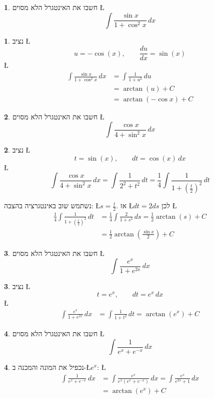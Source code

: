 \documentclass[english,hebrew]{article}
\theoremstyle{definition}
\newtheorem*{problem*}{\protect\problemname}
\theoremstyle{definition}
\newtheorem*{sol*}{\protect\solutionname}
\providecommand{\problemname}{בעיה}
\providecommand{\solutionname}{פתרון}
\begin{document}
\begin{problem*}
חשבו את האינטגרל הלא מסוים \L{%
\[
\int\frac{\sin x}{1+\cos^{2}x}\,dx
\]
}%
\end{problem*}
\begin{sol*}
נציב \L{%
\[
u=-\cos(x),\qquad\frac{du}{dx}=\sin(x)
\]
}%
\L{%
\begin{align*}
\int\frac{\sin x}{1+\cos^{2}x}\,dx & =\int\frac{1}{1+u^{2}}\,du\\
 & =\arctan(u)+C\\
 & =\arctan(-\cos x)+C
\end{align*}
}%
\end{sol*}
\begin{problem*}
חשבו את האינטגרל הלא מסוים \L{%
\[
\int\frac{\cos x}{4+\sin^{2}x}\,dx
\]
}%
\end{problem*}
\begin{sol*}
נציב \L{%
\[
t=\sin(x),\qquad dt=\cos(x)\,dx
\]
}%
\L{%
\[
\int\frac{\cos x}{4+\sin^{2}x}\,dx=\int\frac{1}{2^{2}+t^{2}}\,dt=\frac{1}{4}\int\frac{1}{1+\left(\frac{t}{2}\right)^{2}}\,dt
\]
}%

נשתמש שוב באינטגרציה בהצבה: \L{$s=\frac{t}{2}$}. אז \L{$dt=2ds$}
לכן \L{%
\begin{align*}
\frac{1}{4}\int\frac{1}{1+\left(\frac{t}{2}\right)^{2}}\,dt & =\frac{1}{4}\int\frac{2}{1+s^{2}}\,ds=\frac{1}{2}\arctan(s)+C\\
 & =\frac{1}{2}\arctan\!\left(\frac{\sin x}{2}\right)+C
\end{align*}
}%
\end{sol*}
\begin{problem*}
חשבו את האינטגרל הלא מסוים \L{%
\[
\int\frac{e^{x}}{1+e^{2x}}\,dx
\]
}%
\end{problem*}
\begin{sol*}
נציב \L{%
\[
t=e^{x},\qquad dt=e^{x}\,dx
\]
}%
\L{%
\begin{align*}
\int\frac{e^{x}}{1+e^{2x}}\,dx & =\int\frac{1}{1+t^{2}}\,dt=\arctan(e^{x})+C
\end{align*}
}%
\end{sol*}
\begin{problem*}
חשבו את האינטגרל הלא מסוים \L{%
\[
\int\frac{1}{e^{x}+e^{-x}}\,dx
\]
}%
\end{problem*}
\begin{sol*}
נכפיל את המונה והמכנה ב-\L{$e^{x}$}: \L{%
\begin{align*}
\int\frac{1}{e^{x}+e^{-x}}\,dx & =\int\frac{e^{x}}{e^{x}\left(e^{x}+e^{-x}\right)}\,dx=\int\frac{e^{x}}{e^{2x}+1}\,dx\\
 & =\arctan(e^{x})+C
\end{align*}
}%
\end{sol*}
\end{document}
